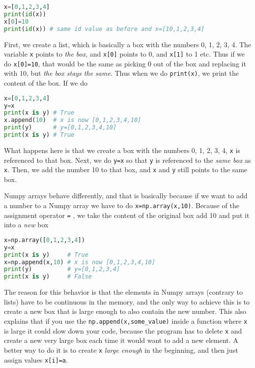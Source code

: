 \documentclass[graybox,sectrefs,envcountresetchap,open=right,final]{svmonodo}
\begin{document}
\begin{lstlisting}[language=python,style=blue1bar]
x=[0,1,2,3,4]
print(id(x))
x[0]=10
print(id(x)) # same id value as before and x=[10,1,2,3,4]

\end{lstlisting}

First, we create a list, which is basically a box with the numbers 0, 1, 2, 3, 4. The variable \texttt{x} points to \emph{the box}, and \texttt{x[0]} points to 0, and \texttt{x[1]} to 1 etc. Thus if we do \texttt{x[0]=10}, that would be the same as picking 0 out of the box and replacing it with 10, but \emph{the box stays the same}. Thus when we do \texttt{print(x)}, we print the content of the box. If we do







\begin{lstlisting}[language=python,style=blue1bar]
x=[0,1,2,3,4]
y=x
print(x is y) # True
x.append(10)  # x is now [0,1,2,3,4,10]
print(y)      # y=[0,1,2,3,4,10]
print(x is y) # True

\end{lstlisting}

What happens here is that we create a box with the numbers 0, 1, 2, 3, 4, \texttt{x} is referenced to that box. Next, we do \texttt{y=x} so that \texttt{y} is referenced to the \emph{same box} as \texttt{x}. Then, we add the number 10 to that box, and \texttt{x} and \texttt{y} still points to the same box.

Numpy arrays behave differently, and that is basically because if we want to add a number to a Numpy array we have to do \texttt{x=np.array(x,10)}. Because of the assignment operator \texttt{=} , we take the content of the original box add 10 and put it into a \emph{new} box







\begin{lstlisting}[language=python,style=blue1bar]
x=np.array([0,1,2,3,4])
y=x
print(x is y)     # True
x=np.append(x,10) # x is now [0,1,2,3,4,10]
print(y)          # y=[0,1,2,3,4]
print(x is y)     # False

\end{lstlisting}

The reason for this behavior is that the elements in Numpy arrays (contrary to lists) have to be continuous in the memory, and the only way to achieve this is to create a new box that is large enough to also contain the new number. This also explains that if you use the \Verb!np.append(x,some_value)! inside a function where \texttt{x} is large it could slow down your code, because the program has to delete \texttt{x} and create a new very large box each time it would want to add a new element. A better way to do it is to create \texttt{x} \emph{large enough} in the beginning, and then just assign values \texttt{x[i]=a}. 
\end{document}
